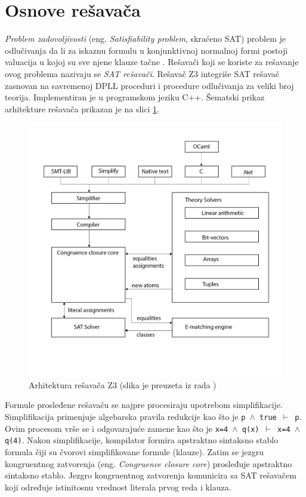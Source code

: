 \documentclass[12pt,oneside]{memoir}
\begin{document}
\section{Osnove rešavača}  \label{sec:num1}
\emph{Problem zadovoljivosti} (eng. \textit{Satisfiability problem}, skraćeno SAT) problem je odlučivanja da li za iskaznu formulu u konjunktivnoj normalnoj formi postoji valuacija u kojoj su sve njene 
klauze tačne \cite{Handbook}. 
Rešavači koji se koriste za rešavanje ovog problema nazivaju se \emph{SAT rešavači}. Rešavač Z3 integriše SAT rešavač zasnovan na savremenoj DPLL proceduri i procedure odlučivanja za veliki broj teorija.
Implementiran je u programskom jeziku C++. Šematski prikaz arhitekture rešavača \cite{EfficientSMTSolver} prikazan je na slici \ref{fig:arhitektura}. 
\begin{figure}[!ht]
  \centering
  \includegraphics[width=1.05\textwidth]{arhitektura.jpg}
  \caption{Arhitektura rešavača Z3 (slika je preuzeta iz rada \cite{EfficientSMTSolver})}
  \label{fig:arhitektura}
\end{figure}
\par
Formule prosleđene rešavaču se najpre procesiraju upotrebom simplifikacije. Simplifikacija primenjuje algebarska pravila redukcije kao što je \texttt{p $\land$ true $\vdash$ p}. Ovim procesom vrše se i odgovarajuće zamene kao što je \texttt{x=4 $\land$ q(x) $\vdash$ x=4 $\land$ q(4)}.
Nakon simplifikacije, kompilator formira apstraktno sintaksno stablo formula čiji su čvorovi simplifikovane formule (klauze). Zatim se jezgru kongruentnog zatvorenja (eng. 
\textit{Congruence closure core}) prosleđuje apstraktno sintaksno stablo. Jezgro kongruentnog zatvorenja komunicira sa SAT rešavačem koji određuje istinitosnu vrednost literala prvog reda i klauza. 
\par
\end{document}
